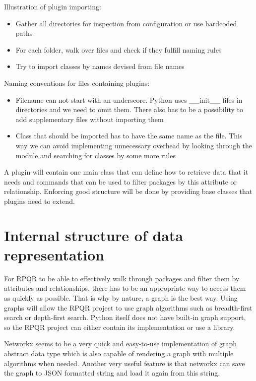 Illustration of plugin importing:
\begin{itemize}
  \item Gather all directories for inspection from configuration or use hardcoded paths
  \item For each folder, walk over files and check if they fulfill naming rules
  \item Try to import classes by names devised from file names
\end{itemize}

Naming conventions for files containing plugins:
\begin{itemize}
  \item Filename can not start with an underscore. Python uses \_\_init\_\_ files
  in directories and we need to omit them. There also has to be a possibility to add supplementary files without importing them
  \item Class that should be imported has to have the same name as the file. This way we can avoid
  implementing unnecessary overhead by looking through the module and searching for classes by some
  more rules
\end{itemize}

A plugin will contain one main class that can define how to retrieve data that it needs and commands
that can be used to filter packages by this attribute or relationship. Enforcing good structure
will be done by providing base classes that plugins need to extend.

\newpage

\section{Internal structure of data representation}
For RPQR to be able to effectively walk through packages and filter them by attributes and relationships,
there has to be an appropriate way to access them as quickly as possible. That is why by nature, a graph
is the best way. Using graphs will allow the RPQR project to use graph algorithms such as breadth-first search
or depth-first search. Python itself does not have built-in graph support, so the RPQR project can either
contain its implementation or use a library.

Networkx seems to be a very quick and easy-to-use implementation of graph abstract data type which is
also capable of rendering a graph with multiple algorithms when needed. Another very useful feature
is that networkx can save the graph to JSON formatted string and load it again from this string.

